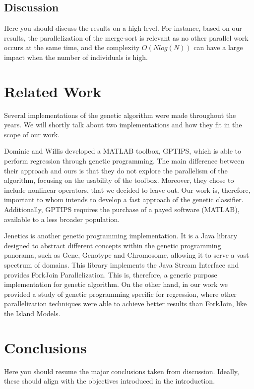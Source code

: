 \documentclass[runningheads]{llncs}
\begin{document}
\subsection{Discussion}

Here you should discuss the results on a high level. For instance, based on our results, the parallelization of the merge-sort is relevant as no other parallel work occurs at the same time, and the complexity $O(N log(N))$ can have a large impact when the number of individuals is high.

\section{Related Work}

Several implementations of the genetic algorithm were made throughout the years. We will shortly talk about two implementations and how they fit in the scope of our work.

Dominic and Willis  \cite{GPTIPS} developed a MATLAB toolbox, GPTIPS, which is able to perform regression through genetic programming. The main difference between their approach and  ours is that they do not explore the parallelism of the algorithm, focusing on the usability of the toolbox. Moreover, they chose to include nonlinear operators, that we decided to leave out. Our work is, therefore, important to whom intends to develop a fast approach of the genetic classifier. Additionally, GPTIPS requires the purchase of a payed software (MATLAB), available to a less broader population.

Jenetics \cite{jenetics} is another genetic programming implementation. It is a Java library designed to abstract different concepts within the genetic programming panorama, such as Gene, Genotype and Chromosome, allowing it to serve a vast spectrum of domains. This library implements the Java Stream Interface and provides ForkJoin Parallelization. This is, therefore, a generic purpose implementation for genetic algorithm. On the other hand, in our work we provided a study of genetic programming specific for regression, where other parallelization techniques were able to achieve better results than ForkJoin, like the Island Models.

\section{Conclusions}

Here you should resume the major conclusions taken from discussion. Ideally, these should align with the objectives introduced in the introduction.
\end{document}
